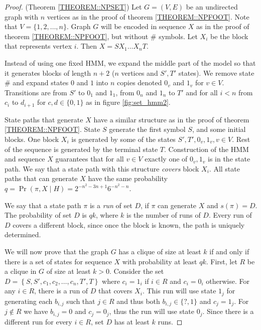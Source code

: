 \begin{proof}(Theorem \ref{THEOREM::NPSET})
Let $G=(V,E)$ be an undirected graph with $n$ vertices as in the proof of theorem
\ref{THEOREM::NPFOOT}. Note that $V = \{1, 2, \dots, n\}$. Graph $G$ will be encoded in
sequence $X$ as in the proof of theorem \ref{THEOREM::NPFOOT}, but without $\#$ symbols.
Let $X_i$ be the block that represents vertex $i$. Then $X=SX_1\dots X_nT$.

Instead of using one fixed HMM, we expand the middle part of the model so that it
generates blocks of length $n+2$ ($n$ vertices and $S', T'$ states). We remove
state $\#$ and expand states $0$ and $1$ into $n$ copies 
denoted $0_v$ and $1_v$ for $v \in V$.  Transitions are from $S'$ to $0_1$ and
$1_1$, from $0_n$ and $1_n$ to $T'$ and for all $i<n$ from $c_i$ to $d_{i+1}$
for $c,d\in \{0, 1\}$ as in figure  \ref{fig:set_hmm2}. 


State paths that generate $X$ have a similar structure as in the proof of theorem
\ref{THEOREM::NPFOOT}. State $S$ generate the first symbol $S$, and some initial blocks.
One block $X_i$ is generated by some of the states $S', T', 0_v, 1_v, v\in
V$.  Rest of the sequence is generated by the terminal state $T$.  Construction of
the HMM and sequence $X$ guarantees that for all $v\in V$ exactly one of $0_v, 1_v$
is in the state path. 
We say that a state path with this structure
\emph{covers} block $X_i$. All state paths that can generate $X$ have the same
probability $q = \Pr(\pi, X\mid H) = 2^{-n^2-3n+1}6^{-n^2 - n}$.

We say that a state path $\pi$ is a \emph{run} of set $D$, if $\pi$ can generate
$X$ and $s(\pi) = D$. The probability of set $D$ is $qk$, where $k$ is the
number of runs of $D$. Every run of $D$ covers a different block, since once the
block is known, the path is uniquely determined.

We will now prove that the graph $G$ has a clique of size at least $k$ if and
only if there is a set of states for sequence $X$ with probability at least
$qk$.  First, let $R$ be a clique in $G$ of size at least $k>0$.  Consider the
set $D=\left\{S,S',{c_1},{c_2},\dots,{c_n},T',T\right\}$ where $c_i=1_i$ if
$i\in R$ and $c_i=0_i$ otherwise. For any $i\in R$, there is a run of
$D$ that covers $X_i$. This run will use state $1_j$ for generating each
$b_{i,j}$ such that $j\in R$ and thus both $b_{i,j}\in \{?,1\}$ and $c_j=1_j$.
For $j\notin R$ we have $b_{i,j}=0$ and $c_j=0_j$, thus the run will use state
$0_j$. Since there is a different run for every $i\in R$, set $D$ has
at least $k$ runs.


\end{proof}
